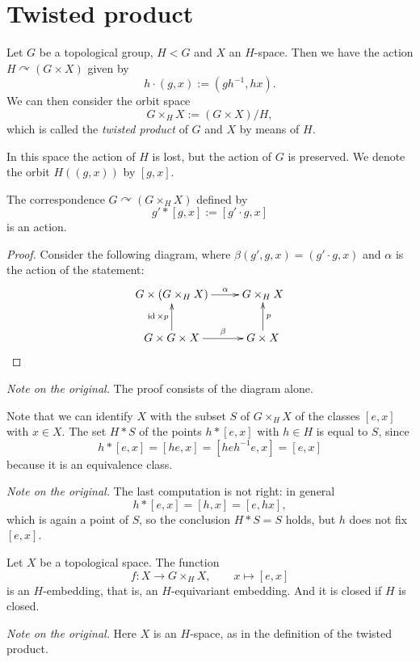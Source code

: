\section{Twisted product}
\label{section-twisted-product}

Let $G$ be a topological group, $H<G$
and $X$ an $H$-space. Then we have the
action $H\curvearrowright(G\times X)$
given by
$$
h\cdot(g,x):=(gh^{-1},hx).
$$
We can then consider the orbit space
$$
G\times_HX:=(G\times X)/H,
$$
which is called the
{\it twisted product} of $G$ and $X$
by means of $H$.

In this space the action of $H$ is
lost, but the action of $G$ is
preserved. We denote the orbit
$H((g,x))$ by $[g,x]$.

\begin{theorem}
\label{theorem-action-on-twisted-product}
The correspondence
$G\curvearrowright(G\times_HX)$ defined
by
$$
g'*[g,x]:=[g'\cdot g,x]
$$
is an action.
\end{theorem}

\begin{proof}
Consider the following diagram, where
$\beta(g',g,x)=(g'\cdot g,x)$ and
$\alpha$ is the action of the
statement:
$$
\xymatrix{
G\times(G\times_HX)
  \ar[r]^-{\alpha}
  & G\times_HX \\
G\times G\times X
  \ar[u]^{\operatorname{id}\times p}
  \ar[r]^-{\beta}
  & G\times X \ar[u]_{p}
}
$$
\end{proof}

\noindent
{\it Note on the original.} The proof
consists of the diagram alone.

Note that we can identify $X$ with the
subset $S$ of $G\times_HX$ of the
classes $[e,x]$ with $x\in X$. The set
$H*S$ of the points $h*[e,x]$ with
$h\in H$ is equal to $S$, since
$$
h*[e,x]=[he,x]
=[heh^{-1}e,x]=[e,x]
$$
because it is an equivalence class.

\noindent
{\it Note on the original.} The last
computation is not right: in general
$$
h*[e,x]=[h,x]=[e,hx],
$$
which is again a point of $S$, so the
conclusion $H*S=S$ holds, but $h$ does
not fix $[e,x]$.

\begin{theorem}
\label{theorem-embedding-twisted-product}
Let $X$ be a topological space. The
function
$$
f:X\to G\times_HX,
\qquad
x\mapsto[e,x]
$$
is an $H$-embedding, that is, an
$H$-equivariant embedding. And it is
closed if $H$ is closed.
\end{theorem}

\noindent
{\it Note on the original.} Here $X$ is
an $H$-space, as in the definition of
the twisted product.

